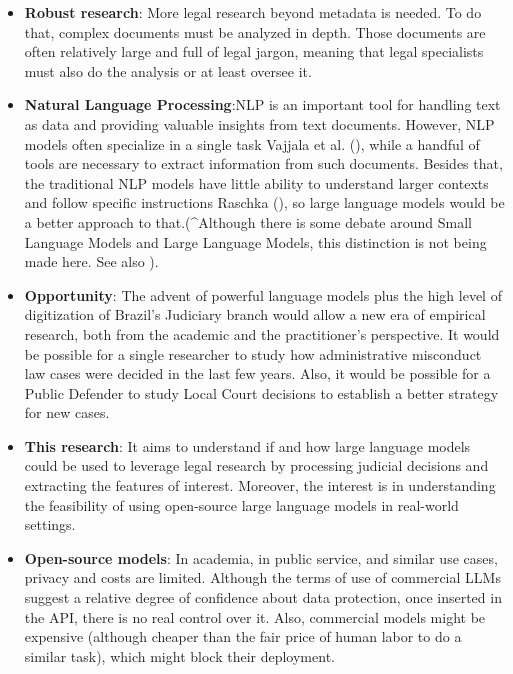 \documentclass[
  12pt,
  letterpaper,
]{book}
\begin{document}
\begin{itemize}
\item
  \textbf{Robust research}: More legal research beyond metadata is
  needed. To do that, complex documents must be analyzed in depth. Those
  documents are often relatively large and full of legal jargon, meaning
  that legal specialists must also do the analysis or at least oversee
  it.
\item
  \textbf{Natural Language Processing}:NLP is an important tool for
  handling text as data and providing valuable insights from text
  documents. However, NLP models often specialize in a single task
  Vajjala et al. (), while a
  handful of tools are necessary to extract information from such
  documents. Besides that, the traditional NLP models have little
  ability to understand larger contexts and follow specific instructions
  Raschka (), so large language
  models would be a better approach to that.(\^{}Although there is some
  debate around Small Language Models and Large Language Models, this
  distinction is not being made here. See also
  ).
\item
  \textbf{Opportunity}: The advent of powerful language models plus the
  high level of digitization of Brazil's Judiciary branch would allow a
  new era of empirical research, both from the academic and the
  practitioner's perspective. It would be possible for a single
  researcher to study how administrative misconduct law cases were
  decided in the last few years. Also, it would be possible for a Public
  Defender to study Local Court decisions to establish a better strategy
  for new cases.
\item
  \textbf{This research}: It aims to understand if and how large
  language models could be used to leverage legal research by processing
  judicial decisions and extracting the features of interest. Moreover,
  the interest is in understanding the feasibility of using open-source
  large language models in real-world settings.
\item
  \textbf{Open-source models}: In academia, in public service, and
  similar use cases, privacy and costs are limited. Although the terms
  of use of commercial LLMs suggest a relative degree of confidence
  about data protection, once inserted in the API, there is no real
  control over it. Also, commercial models might be expensive (although
  cheaper than the fair price of human labor to do a similar task),
  which might block their deployment.
\end{itemize}
\end{document}
